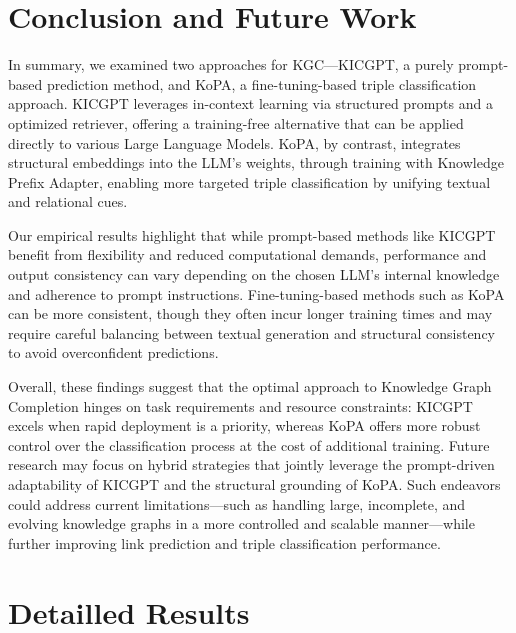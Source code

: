 \documentclass[12pt,a4paper]{article}
\begin{document}
%
%


\section{Conclusion and Future Work}\label{sec:conclusion-and-future-work}

In summary, we examined two approaches for KGC—KICGPT, a purely prompt-based prediction method, and KoPA, a fine-tuning-based triple classification approach.
KICGPT leverages in-context learning via structured prompts and a optimized retriever, offering a training-free alternative that can be applied directly to various Large Language Models.
KoPA, by contrast, integrates structural embeddings into the LLM's weights, through training with Knowledge Prefix Adapter, enabling more targeted triple classification by unifying textual and relational cues.

Our empirical results highlight that while prompt-based methods like KICGPT benefit from flexibility and reduced computational demands, performance and output consistency can vary depending on the chosen LLM's internal knowledge and adherence to prompt instructions.
Fine-tuning-based methods such as KoPA can be more consistent, though they often incur longer training times and may require careful balancing between textual generation and structural consistency to avoid overconfident predictions.

Overall, these findings suggest that the optimal approach to Knowledge Graph Completion hinges on task requirements and resource constraints: KICGPT excels when rapid deployment is a priority, whereas KoPA offers more robust control over the classification process at the cost of additional training.
Future research may focus on hybrid strategies that jointly leverage the prompt-driven adaptability of KICGPT and the structural grounding of KoPA. Such endeavors could address current limitations—such as handling large, incomplete, and evolving knowledge graphs in a more controlled and scalable manner—while further improving link prediction and triple classification performance.



\appendix


\section{Detailled Results}
\end{document}
